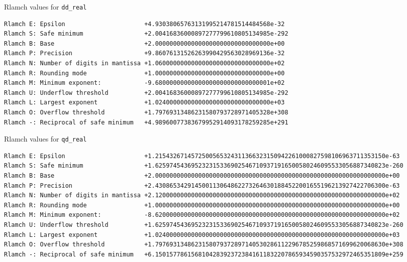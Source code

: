 \documentclass[12pt]{article}
\begin{document}
\begin{table}
\caption{Rlamch values for {\tt dd\_real}}\label{rlamch_dd}
\begin{center}
\begin{verbatim}
Rlamch E: Epsilon                      +4.93038065763131995214781514484568e-32
Rlamch S: Safe minimum                 +2.00416836000897277799610805134985e-292
Rlamch B: Base                         +2.00000000000000000000000000000000e+00
Rlamch P: Precision                    +9.86076131526263990429563028969136e-32
Rlamch N: Number of digits in mantissa +1.06000000000000000000000000000000e+02
Rlamch R: Rounding mode                +1.00000000000000000000000000000000e+00
Rlamch M: Minimum exponent:            -9.68000000000000000000000000000001e+02
Rlamch U: Underflow threshold          +2.00416836000897277799610805134985e-292
Rlamch L: Largest exponent             +1.02400000000000000000000000000000e+03
Rlamch O: Overflow threshold           +1.79769313486231580793728971405328e+308
Rlamch -: Reciprocal of safe minimum   +4.98960077383679952914093178259285e+291

\end{verbatim}
\end{center}
\end{table}

\begin{table}
\caption{Rlamch values for {\tt qd\_real}}\label{rlamch_qd}
\begin{center}
\scriptsize
{
\begin{verbatim}
Rlamch E: Epsilon                      +1.2154326714572500565324311366323150942261000827598106963711353150e-63
Rlamch S: Safe minimum                 +1.6259745436952323153369025467109371916500580246095533056887340823e-260
Rlamch B: Base                         +2.0000000000000000000000000000000000000000000000000000000000000000e+00
Rlamch P: Precision                    +2.4308653429145001130648622732646301884522001655196213927422706300e-63
Rlamch N: Number of digits in mantissa +2.1200000000000000000000000000000000000000000000000000000000000000e+02
Rlamch R: Rounding mode                +1.0000000000000000000000000000000000000000000000000000000000000000e+00
Rlamch M: Minimum exponent:            -8.6200000000000000000000000000000000000000000000000000000000000000e+02
Rlamch U: Underflow threshold          +1.6259745436952323153369025467109371916500580246095533056887340823e-260
Rlamch L: Largest exponent             +1.0240000000000000000000000000000000000000000000000000000000000000e+03
Rlamch O: Overflow threshold           +1.7976931348623158079372897140530286112296785259868571699620068630e+308
Rlamch -: Reciprocal of safe minimum   +6.1501577861568104283923723841611832207865934590357532972465351809e+259
\end{verbatim}
}
\end{center}
\end{table}
\end{document}

